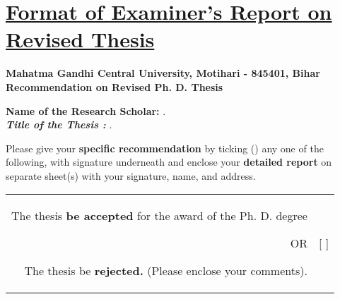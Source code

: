 \chapter*{\uline{Format of Examiner's Report on Revised Thesis}}

\begin{center} 
\textbf{\normalsize Mahatma Gandhi Central University, Motihari - 845401, Bihar} \\ 
\textbf{\normalsize Recommendation on Revised Ph. D. Thesis} 
\end{center} 
\vspace{-.75cm} 
\begin{flushleft} 
\textbf{Name of the Research Scholar: }\sAuthor . \\
\textbf{\textit{Title of the Thesis : }} \Titel .
\end{flushleft} 

Please give your \textbf{specific recommendation} by ticking (\checkmark) any one of the following, with signature underneath and enclose your \textbf{detailed report} on separate sheet(s) with your signature, name, and address.\vspace{-.25cm}

\begin{table}[h]
\begin{center}
\begin{tabular}{r  l}
   \begin{minipage}{0.85\textwidth}
\begin{flushleft}
The thesis \textbf{be accepted} for the award of the Ph. D. degree
\begin{center}
OR
\end{center}
The thesis be \textbf{rejected.} (Please enclose your comments).
\end{flushleft}
\end{minipage}
&
\begin{minipage}{0.05\textwidth}
\begin{flushright}
[\hspace{2mm} ]
\begin{center}
\bigskip
\end{center}
[\hspace{2mm} ]
\end{flushright}
\end{minipage}
\noindent
\\
\end{tabular}
\end{center}
\end{table}

